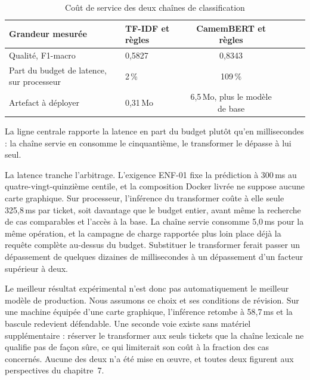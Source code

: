 \begin{table}[!htbp]
\centering
\styletableau
\caption{Coût de service des deux chaînes de classification}
\label{tab:cout}
\renewcommand{\arraystretch}{1.25}
\begin{tabular}{|Bp{4.6cm}|Cp{3.1cm}|Cp{3.1cm}|}
\hline
{}
\textbf{Grandeur mesurée} & \textbf{TF-IDF et règles} & \textbf{CamemBERT et règles} \\
\hline
Qualité, F1-macro & 0,5827 & 0,8343 \\
\hline
Part du budget de latence, sur processeur & 2\,\% & 109\,\% \\
\hline
Artefact à déployer & 0,31\,Mo & 6,5\,Mo, plus le modèle de base \\
\hline
\end{tabular}
\end{table}

La ligne centrale rapporte la latence en part du budget plutôt qu'en millisecondes : la chaîne
servie en consomme le cinquantième, le transformer le dépasse à lui seul.

La latence tranche l'arbitrage. L'exigence ENF-01 fixe la prédiction à 300\,ms au
quatre-vingt-quinzième centile, et la composition Docker livrée ne suppose aucune carte graphique.
Sur processeur, l'inférence du transformer coûte à elle seule 325,8\,ms par ticket, soit davantage
que le budget entier, avant même la recherche de cas comparables et l'accès à la base. La chaîne
servie consomme 5,0\,ms pour la même opération, et la campagne de charge rapportée plus loin place
déjà la requête complète au-dessus du budget. Substituer le transformer ferait passer un
dépassement de quelques dizaines de millisecondes à un dépassement d'un facteur supérieur à deux.

Le meilleur résultat expérimental n'est donc pas automatiquement le meilleur modèle de production.
Nous assumons ce choix et ses conditions de révision. Sur une machine équipée d'une carte
graphique, l'inférence retombe à 58,7\,ms et la bascule redevient défendable. Une seconde voie
existe sans matériel supplémentaire : réserver le transformer aux seuls tickets que la chaîne
lexicale ne qualifie pas de façon sûre, ce qui limiterait son coût à la fraction des cas concernés.
Aucune des deux n'a été mise en œuvre, et toutes deux figurent aux perspectives du chapitre~7.

